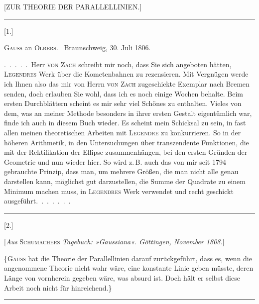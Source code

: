 \clearpage
{}\centerline{[ZUR THEORIE DER PARALLELLINIEN.]}

\bigskip
\hrule
\bigskip

\centerline{[1.]}

\smallskip

\centerline{\textsc{Gauss} an \textsc{Olbers}. \ Braunschweig, 30. Juli 1806.}

\smallskip

.\ .\ .\ .\ .\ Herr \textsc{von Zach} schreibt mir noch, dass Sie sich angeboten hätten, \textsc{Legendres} Werk über die Kometenbahnen zu rezensieren. Mit Vergnügen werde ich Ihnen also das mir von Herrn \textsc{von Zach} zugeschickte Exemplar nach Bremen senden, doch erlauben Sie wohl, dass ich es noch einige Wochen behalte. Beim ersten Durchblättern scheint es mir sehr viel Schönes zu enthalten. Vieles von dem, was an meiner Methode besonders in ihrer ersten Gestalt eigentümlich war, finde ich auch in diesem Buch wieder. Es scheint mein Schicksal zu sein, in fast allen meinen theoretischen Arbeiten mit \textsc{Legendre} zu konkurrieren. So in der höheren Arithmetik, in den Untersuchungen über transzendente Funktionen, die mit der Rektifikation der Ellipse zusammenhängen, bei den ersten Gründen der Geometrie und nun wieder hier. So wird z.\,B. auch das von mir seit 1794 gebrauchte Prinzip, dass man, um mehrere Größen, die man nicht alle genau darstellen kann, möglichst gut darzustellen, die Summe der Quadrate zu einem Minimum machen muss, in \textsc{Legendres} Werk verwendet und recht geschickt ausgeführt.\ .\ .\ .\ .\ .\ .

\bigskip
\hrule
\bigskip

\centerline{[2.]}

\smallskip

\centerline{[\emph{Aus} \textsc{Schumachers} \emph{Tagebuch: »Gaussiana«. Göttingen, November 1808.}]}

\smallskip

\{\textsc{Gauss} hat die Theorie der Parallellinien darauf zurückgeführt, dass es, wenn die angenommene Theorie nicht wahr wäre, eine konstante Linie geben müsste, deren Länge von vornherein gegeben wäre, was absurd ist. Doch hält er selbst diese Arbeit noch nicht für hinreichend.\}

\bigskip
\hrule
